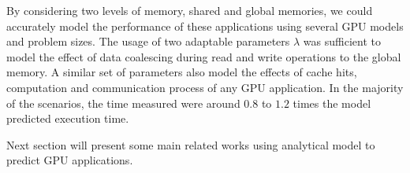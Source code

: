 By considering two levels of memory, shared and global memories, we could accurately model the performance of these applications using several GPU models and problem sizes. The usage of two adaptable parameters $\lambda$ was sufficient to model the effect of data coalescing during read and write operations to the global memory. A similar set of parameters also model the effects of cache hits, computation and communication process of any GPU application. In the majority of the scenarios, the time measured were around $0.8$ to $1.2$ times the model predicted execution time. 

Next section will present some main related works using analytical model to predict GPU applications.
